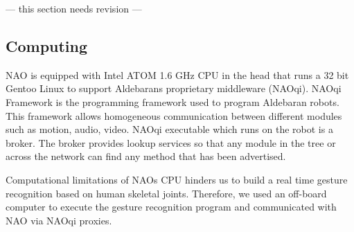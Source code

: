 

--- this section needs revision ---

\subsection{Computing} NAO is equipped with Intel ATOM 1.6 GHz CPU in the head that runs a 32 bit Gentoo Linux to support Aldebarans proprietary middleware (NAOqi). NAOqi Framework is the programming framework used to program Aldebaran robots. This framework allows homogeneous communication between different modules such as motion, audio, video. NAOqi executable which runs on the robot is a broker. The broker provides lookup services so that any module in the tree or across the network can find any method that has been advertised.



Computational limitations of NAOs CPU hinders us to build a real time gesture recognition based on human skeletal joints. Therefore, we used an off-board computer to execute the gesture recognition program and communicated with NAO via NAOqi proxies. 
